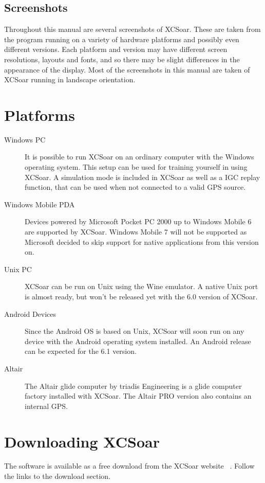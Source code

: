 \documentclass[a4paper,12pt]{refrep}
\begin{document}
\subsection*{Screenshots}
Throughout this manual are several screenshots of XCSoar. These are
taken from the program running on a variety of hardware platforms and possibly
even different versions. Each platform and version may have different screen
resolutions, layouts and fonts, and so there may be slight differences in the
appearance of the display. Most of the screenshots in this manual are taken of
XCSoar running in landscape orientation.

\section{Platforms}
\begin{description}
\item[Windows PC]
It is possible to run XCSoar on an ordinary computer with the Windows
operating system. This setup can be used for training yourself in using XCSoar.
A simulation mode is included in XCSoar as well as a IGC replay function, that
can be used when not connected to a valid GPS source.
\item[Windows Mobile PDA]
Devices powered by Microsoft Pocket PC 2000 up to Windows Mobile 6 are
supported by XCSoar. Windows Mobile 7 will not be supported as Microsoft decided
to skip support for native applications from this version on.
\item[Unix PC]
XCSoar can be run on Unix using the Wine emulator. A native Unix port is almost
ready, but won't be released yet with the 6.0 version of XCSoar.
\item[Android Devices]
Since the Android OS is based on Unix, XCSoar will soon run on any device with
the Android operating system installed. An Android release can be expected for
the 6.1 version.
\item[Altair]
The Altair glide computer by triadis Engineering is a glide computer
factory installed with XCSoar.  The Altair PRO version also contains
an internal GPS.
\end{description}

\section{Downloading XCSoar}
The software is available as a free download from the XCSoar website
~\xcsoarwebsite. Follow the links to the download section.
\end{document}
